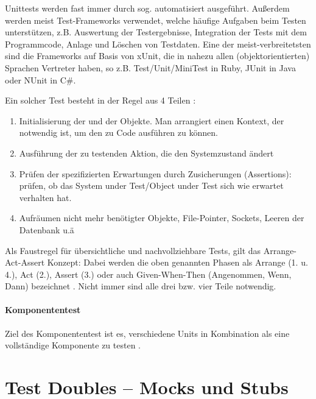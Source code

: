 Unittests werden fast immer durch sog.  automatisiert ausgeführt. Außerdem werden meist Test-Frameworks verwendet, welche häufige Aufgaben beim Testen unterstützen, z.B. Auswertung der Testergebnisse, Integration der Tests mit dem Programmcode, Anlage und Löschen von Testdaten.  Eine der meist-verbreitetsten sind die Frameworks auf Basis von xUnit, die in nahezu allen (objektorientierten) Sprachen Vertreter haben, so z.B. Test/Unit/MiniTest in Ruby, JUnit in Java oder NUnit in C\#.

Ein solcher Test besteht in der Regel aus 4 Teilen \citep{rappin_rails_2011} \citep[Karte 46]{langr_agile_2011}:
\begin{enumerate}
 \item Initialisierung der  und der Objekte. Man arrangiert einen Kontext, der notwendig ist, um den zu Code ausführen zu können.
 \item Ausführung der zu testenden Aktion, die den Systemzustand ändert
 \item Prüfen der spezifizierten Erwartungen durch Zusicherungen (Assertions): prüfen, ob das System under Test/Object under Test sich wie erwartet verhalten hat.
 \item Aufräumen nicht mehr benötigter Objekte, File-Pointer, Sockets, Leeren der Datenbank u.ä
\end{enumerate}
Als Faustregel für übersichtliche und nachvollziehbare Tests, gilt das Arrange-Act-Assert Konzept: Dabei werden die oben genannten Phasen als Arrange (1. u. 4.), Act (2.), Assert (3.) oder auch Given-When-Then (Angenommen, Wenn, Dann) bezeichnet \citep[Karte 46]{langr_agile_2011}. Nicht immer sind alle drei bzw. vier Teile notwendig.

\paragraph{Komponententest}
Ziel des Komponententest ist es, verschiedene Units in Kombination als eine vollständige Komponente zu testen \citep{goodliffe_code_2006}.

 \section{Test Doubles -- Mocks und Stubs}
  \label{sec:mocks}

